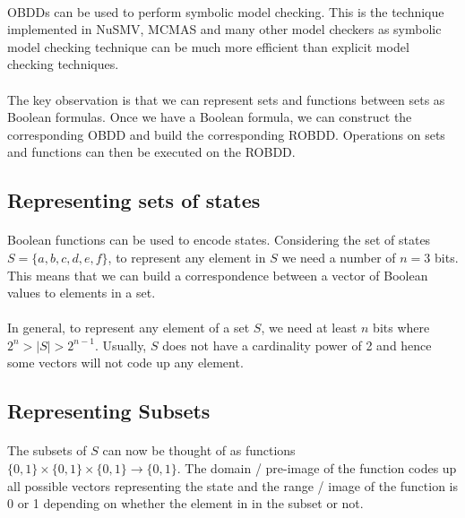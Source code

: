 \documentclass{article}
\theoremstyle{plain}
\theoremstyle{definition}
\begin{document}
\begin{multicols}{2}
\paragraph{} OBDDs can be used to perform symbolic model checking. This is the technique implemented in NuSMV, MCMAS and many other model checkers as symbolic model checking technique can be much more efficient than explicit model checking techniques. 

\paragraph{} The key observation is that we can represent sets and functions between sets as Boolean formulas. Once we have a Boolean formula, we can construct the corresponding OBDD and build the corresponding ROBDD. Operations on sets and functions can then be executed on the ROBDD. 

\subsection{Representing sets of states}

\paragraph{} Boolean functions can be used to encode states. Considering the set of states $S = \{a, b, c, d, e, f\}$, to represent any element in $S$ we need a number of $n = 3$ bits. This means that we can build a correspondence between a vector of Boolean values to elements in a set. 

\paragraph{} In general, to represent any element of a set $S$, we need at least $n$ bits where $2^n > |S| > 2^{n-1}$. Usually, $S$ does not have a cardinality power of 2 and hence some vectors will not code up any element.

\subsection{Representing Subsets}

\paragraph{} The subsets of $S$ can now be thought of as functions $\{0, 1\} \times \{0, 1\} \times \{0, 1\} \rightarrow \{0, 1\}$. The domain / pre-image of the function codes up all possible vectors representing the state and the range / image of the function is 0 or 1 depending on whether the element in in the subset or not.


\end{multicols}
\end{document}
